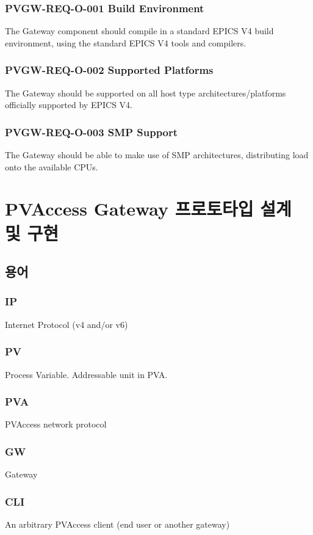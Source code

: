 \documentclass[11pt
  , a4paper
  , article
  , oneside
]{memoir}
\begin{document}
\subsubsection{PVGW-REQ-O-001 Build Environment}
The Gateway component should compile in a standard EPICS V4 build environment, using the standard EPICS V4 tools and compilers.

\subsubsection{PVGW-REQ-O-002 Supported Platforms}
The Gateway should be supported on all host type architectures/platforms officially supported by EPICS V4.

\subsubsection{PVGW-REQ-O-003 SMP Support}
The Gateway should be able to make use of SMP architectures, distributing load onto the available CPUs.





\section{PVAccess Gateway 프로토타입 설계 및 구현}
\subsection{용어}

\subsubsection{IP}
Internet Protocol (v4 and/or v6)

\subsubsection{PV}
Process Variable. Addressable unit in PVA.

\subsubsection{PVA}
PVAccess network protocol

\subsubsection{GW}
Gateway

\subsubsection{CLI}
An arbitrary PVAccess client (end user or another gateway)
\end{document}
